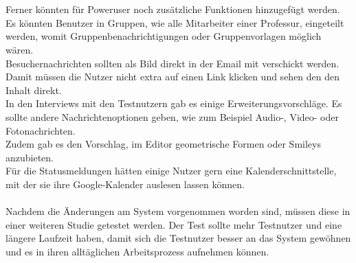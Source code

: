 % 
% 
% 
\\
\\
Ferner könnten für Poweruser noch zusätzliche Funktionen hinzugefügt werden.
\\
Es könnten Benutzer in Gruppen, wie \bspw alle Mitarbeiter einer Professur, eingeteilt werden, womit Gruppenbenachrichtigungen oder Gruppenvorlagen möglich wären.
\\
Besuchernachrichten sollten als Bild direkt in der Email mit verschickt werden.
Damit müssen die Nutzer nicht extra auf einen Link klicken und sehen den den Inhalt direkt.
\\
In den Interviews mit den Testnutzern gab es einige Erweiterungsvorschläge.
Es sollte andere Nachrichtenoptionen geben, wie zum Beispiel Audio-, Video- oder Fotonachrichten.
\\
Zudem gab es den Vorschlag, im Editor geometrische Formen oder Smileys anzubieten.
\\
Für die Statusmeldungen hätten einige Nutzer gern eine Kalenderschnittstelle, mit der sie ihre Google-Kalender auslesen lassen können.
% 
% 
% 
% 
\\
\\
Nachdem die Änderungen am System vorgenommen worden sind, müssen diese in einer weiteren Studie getestet werden.
Der Test sollte mehr Testnutzer und eine längere Laufzeit haben, damit sich die Testnutzer besser an das System gewöhnen und es in ihren alltäglichen Arbeitsprozess aufnehmen können.
\\
